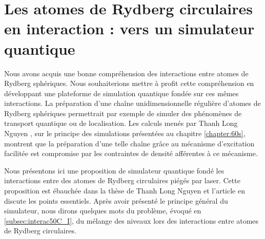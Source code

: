 \chapter{Les atomes de Rydberg circulaires en interaction : vers un simulateur quantique}
\label{chapter:circsim}

\newcommand{\CnCnC}{C_{\mathrm{nC},\mathrm{nC}}}
\newcommand{\CnpCnpC}{C_{\mathrm{n'C},\mathrm{n'C}}}
\newcommand{\CnCnpC}{C_{\mathrm{nC},\mathrm{n'C}}}
\newcommand{\AnCnpC}{A_{\mathrm{nC},\mathrm{n'C}}}

\vfill
\minitoc
\newpage

\noindent Nous avons acquis une bonne compréhension des interactions entre atomes de Rydberg sphériques.
Nous souhaiterions mettre à profit cette compréhension en développant une plateforme de simulation quantique fondée sur ces mêmes interactions.
La préparation d'une chaîne unidimensionnelle régulière d'atomes de Rydberg sphériques permettrait par exemple de simuler des phénomènes de transport quantique ou de localisation.
Les calculs menés par Thanh Long Nguyen \cite{PHD_NGUYEN}, sur le principe des simulations présentées au chapitre \ref{chapter:60s}, montrent que la préparation d'une telle chaîne grâce au mécanisme d'excitation facilitée est compromise par les contraintes de densité afférentes à ce mécanisme.

Nous présentons ici une proposition de simulateur quantique fondé les interactions entre des atomes de Rydberg circulaires piégés par laser.
Cette proposition est ébauchée dans la thèse de Thanh Long Nguyen \cite{PHD_NGUYEN} et l'article \cite{ENS_PRE_CIRCSIM} en discute les points essentiels.
Après avoir présenté le principe général du simulateur, nous dirons quelques mots du problème, évoqué en \ref{subsec:interac50C_I}, du mélange des niveaux lors des interactions entre atomes de Rydberg circulaires.


